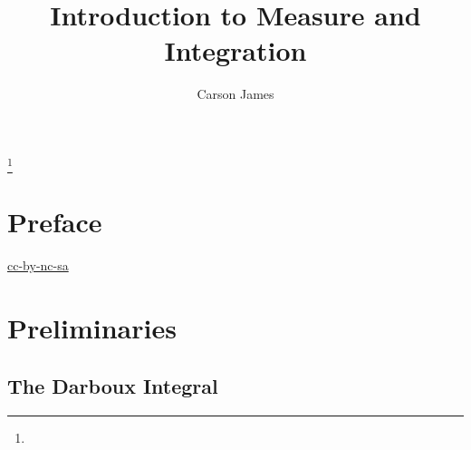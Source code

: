 \documentclass{book}
\begin{document}
	
	\frontmatter
	
	\title{Introduction to Measure and Integration}
	
	
	\author{Carson James}
	\thanks{}
	
	\date{}
	
	\maketitle
	
	
	\setcounter{page}{4}
	
	\tableofcontents
	\printunsrtglossary[type=symbols,style=long,title={Notation}]
	
	
	\mainmatter
	
	\chapter*{Preface}
	
	\begin{flushleft}
		\href{https://creativecommons.org/licenses/by-nc-sa/4.0/legalcode.txt}{cc-by-nc-sa}
	\end{flushleft}

	\newpage
	
	
	
	
	
	
	
	
	
	
	
	
	\chapter{Preliminaries}
	
	\section{The Darboux Integral}
	
\end{document}
